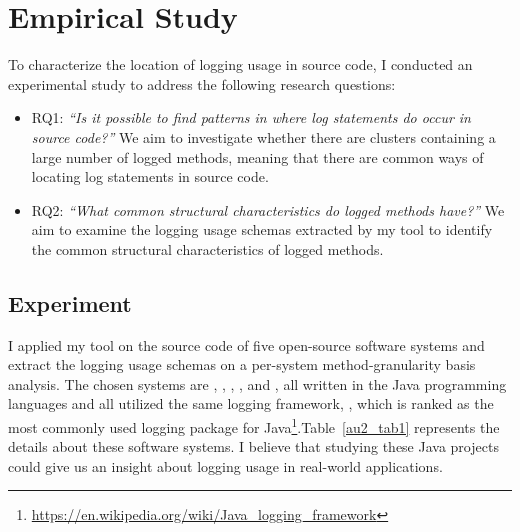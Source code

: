 \chapter{Empirical Study}\label{discover}\label{eval}


To characterize the location of logging usage in source code, I conducted an experimental study to address the following research questions: 

\begin{itemize} [leftmargin=.5in]
\item \textsc{RQ1: }\emph{``Is it possible to find patterns in where log statements do occur in source code?''} We aim to investigate whether there are clusters containing a large number of logged methods, meaning that there are common ways of locating log statements in source code.

\item \textsc{RQ2: }\emph{``What common structural characteristics do logged methods have?''} We aim to examine the logging usage schemas extracted by my tool to identify the common structural characteristics of logged methods. 
\end{itemize}


\section{Experiment}  \label{setup-characterization}
I applied my tool on the source code of five open-source software systems and extract the logging usage schemas on a per-system method-granularity basis analysis. The chosen systems are , , , , and , all written in the Java programming languages and all utilized the same logging framework, , which is ranked as the most commonly used logging package for Java\footnote{\url{https://en.wikipedia.org/wiki/Java_logging_framework}}.Table~\ref{au2_tab1} represents the details about these software systems. I believe that studying these Java projects could give us an insight about logging usage in real-world applications.


